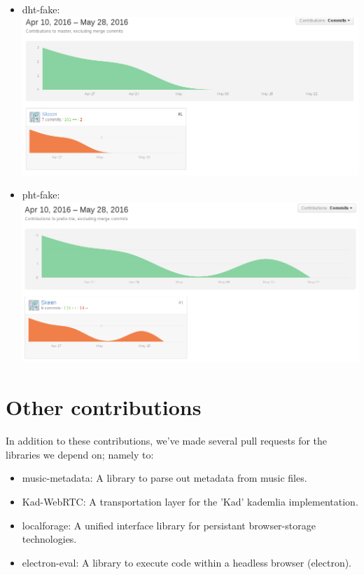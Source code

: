 \begin{itemize}
\item dht-fake: \\
\includegraphics[width=\linewidth]{gfx/dht-fake}

\item pht-fake: \\
\includegraphics[width=\linewidth]{gfx/pht-fake}
\end{itemize}

\section{Other contributions}
In addition to these contributions, we've made several pull requests for the
libraries we depend on; namely to:
\begin{itemize}
\item music-metadata: A library to parse out metadata from music files.
\item Kad-WebRTC: A transportation layer for the 'Kad' kademlia implementation.
\item localforage: A unified interface library for persistant browser-storage
    technologies.
\item electron-eval: A library to execute code within a headless browser
    (electron).
\end{itemize}

